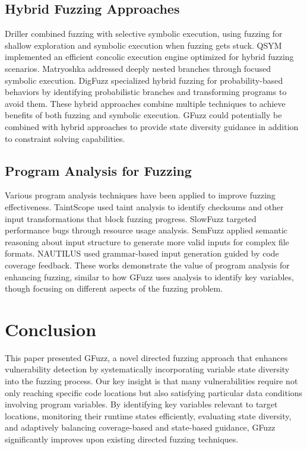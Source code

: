 \documentclass[review]{elsarticle}
\begin{document}
\subsection{Hybrid Fuzzing Approaches}

Driller combined fuzzing with selective symbolic execution, using fuzzing for shallow exploration and symbolic execution when fuzzing gets stuck. QSYM implemented an efficient concolic execution engine optimized for hybrid fuzzing scenarios. Matryoshka addressed deeply nested branches through focused symbolic execution. DigFuzz specialized hybrid fuzzing for probability-based behaviors by identifying probabilistic branches and transforming programs to avoid them. These hybrid approaches combine multiple techniques to achieve benefits of both fuzzing and symbolic execution. GFuzz could potentially be combined with hybrid approaches to provide state diversity guidance in addition to constraint solving capabilities.

\subsection{Program Analysis for Fuzzing}

Various program analysis techniques have been applied to improve fuzzing effectiveness. TaintScope used taint analysis to identify checksums and other input transformations that block fuzzing progress. SlowFuzz targeted performance bugs through resource usage analysis. SemFuzz applied semantic reasoning about input structure to generate more valid inputs for complex file formats. NAUTILUS used grammar-based input generation guided by code coverage feedback. These works demonstrate the value of program analysis for enhancing fuzzing, similar to how GFuzz uses analysis to identify key variables, though focusing on different aspects of the fuzzing problem.

\section{Conclusion}
\label{sec:conclusion}

This paper presented GFuzz, a novel directed fuzzing approach that enhances vulnerability detection by systematically incorporating variable state diversity into the fuzzing process. Our key insight is that many vulnerabilities require not only reaching specific code locations but also satisfying particular data conditions involving program variables. By identifying key variables relevant to target locations, monitoring their runtime states efficiently, evaluating state diversity, and adaptively balancing coverage-based and state-based guidance, GFuzz significantly improves upon existing directed fuzzing techniques.
\end{document}
